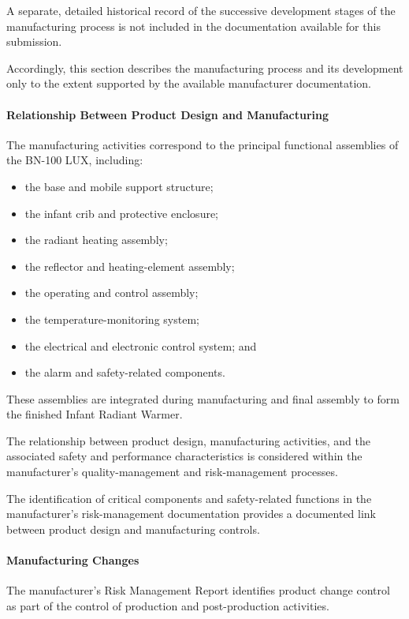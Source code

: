 A separate, detailed historical record of the successive development
stages of the manufacturing process is not included in the
documentation available for this submission.

Accordingly, this section describes the manufacturing process and
its development only to the extent supported by the available
manufacturer documentation.

\paragraph{Relationship Between Product Design and Manufacturing}

The manufacturing activities correspond to the principal functional
assemblies of the BN-100 LUX, including:

\begin{itemize}
    \item the base and mobile support structure;
    \item the infant crib and protective enclosure;
    \item the radiant heating assembly;
    \item the reflector and heating-element assembly;
    \item the operating and control assembly;
    \item the temperature-monitoring system;
    \item the electrical and electronic control system; and
    \item the alarm and safety-related components.
\end{itemize}

These assemblies are integrated during manufacturing and final
assembly to form the finished Infant Radiant Warmer.

The relationship between product design, manufacturing activities,
and the associated safety and performance characteristics is
considered within the manufacturer's quality-management and
risk-management processes.

The identification of critical components and safety-related
functions in the manufacturer's risk-management documentation
provides a documented link between product design and manufacturing
controls.

\paragraph{Manufacturing Changes}

The manufacturer's Risk Management Report identifies product
change control as part of the control of production and
post-production activities.

